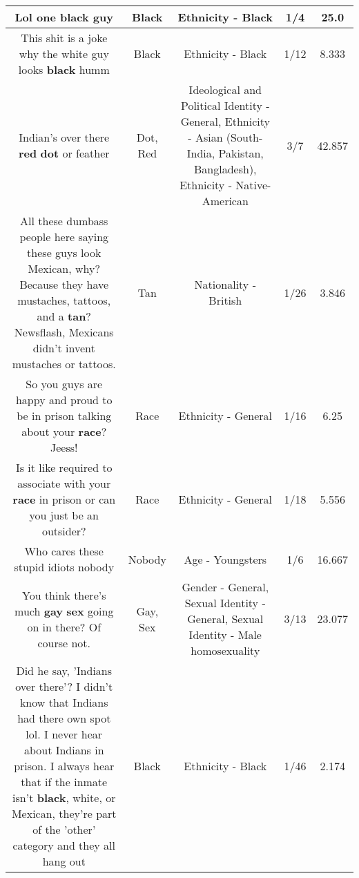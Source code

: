 \documentclass[11pt]{article}
\newlength\mylength
\begin{document}
\begin{center}
\begin{longtable}{|C{.65\mylength}|C{.30\mylength}|C{.12\mylength}|C{.12\mylength}|C{.12\mylength}|}
  \small Lol one \textbf{black} guy\normalsize   & Black & Ethnicity - Black & 1/4 & 25.0 \\  \hline
  \small This shit is a joke why the white guy looks \textbf{black}   humm\normalsize   & Black & Ethnicity - Black & 1/12 & 8.333 \\  \hline
  \small Indian's  over there \textbf{r\textbf{ed}} \textbf{dot} or feather\normalsize   & Dot, Red &  Ideological and Political Identity - General, Ethnicity - Asian (South- India, Pakistan, Bangladesh), Ethnicity - Native-American & 3/7 & 42.857 \\  \hline
  \small All these dumbass people here saying these guys look Mexican, why? Because they have mustaches, tattoos, and a \textbf{tan}? Newsflash, Mexicans didn't invent mustaches or tattoos.\normalsize   & Tan & Nationality - British & 1/26 & 3.846 \\  \hline
  \small So you guys are happy and proud to be in prison talking about your \textbf{race}? Jeess!\normalsize   & Race & Ethnicity - General & 1/16 & 6.25 \\  \hline
  \small Is it like required to associate with your \textbf{race} in prison or can you just be an outsider?\normalsize   & Race & Ethnicity - General & 1/18 & 5.556 \\  \hline
  \small Who cares these stupid idiots nobody\normalsize   & Nobody & Age - Youngsters & 1/6 & 16.667 \\  \hline
  \small You think there's much \textbf{g\textbf{ay}} \textbf{sex} going on in there? Of course not.\normalsize   & Gay, Sex & Gender - General, Sexual Identity - General, Sexual Identity - Male homosexuality & 3/13 & 23.077 \\  \hline
  \small Did he say, 'Indians over there'?  I didn't know that Indians had there own spot lol.  I never hear about Indians in prison.  I always hear that if the inmate isn't \textbf{black}, white, or Mexican, they're part of the 'other' category and they all hang out\normalsize   & Black & Ethnicity - Black & 1/46 & 2.174 \\  \hline

\end{longtable}
\end{center}
\end{document}
